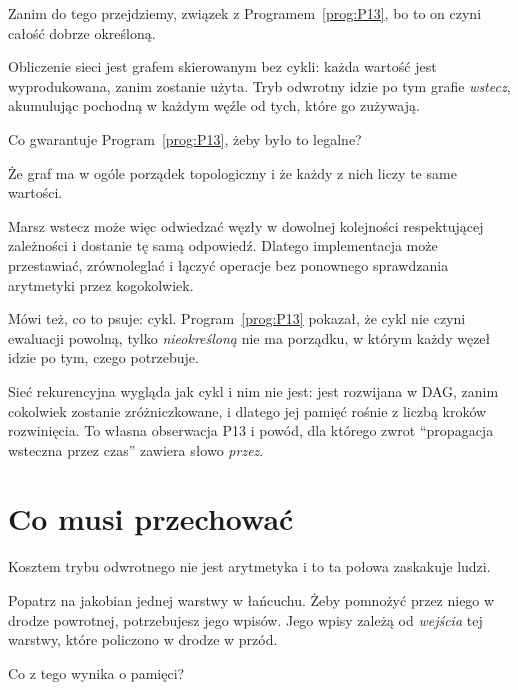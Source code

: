 \begin{fr}
Zanim do tego przejdziemy, związek z Programem~\ref{prog:P13}, bo to on czyni
całość dobrze określoną.

Obliczenie sieci jest grafem skierowanym bez cykli: każda wartość jest
wyprodukowana, zanim zostanie użyta. Tryb odwrotny idzie po tym grafie
\emph{wstecz}, akumulując pochodną w każdym węźle od tych, które go zużywają.

Co gwarantuje Program~\ref{prog:P13}, żeby było to legalne?
\nextframe
\end{fr}

\begin{fr}
\begin{ansblock}
Że graf ma w ogóle porządek topologiczny i że każdy z nich liczy te same
wartości.
\end{ansblock}

Marsz wstecz może więc odwiedzać węzły w dowolnej kolejności respektującej
zależności i dostanie tę samą odpowiedź. Dlatego implementacja może
przestawiać, zrównoleglać i łączyć operacje bez ponownego sprawdzania
arytmetyki przez kogokolwiek.

\begin{note}
Mówi też, co to psuje: cykl. Program~\ref{prog:P13} pokazał, że cykl nie czyni
ewaluacji powolną, tylko \emph{nieokreśloną} \dash{} nie ma porządku, w którym
każdy węzeł idzie po tym, czego potrzebuje.

Sieć rekurencyjna wygląda jak cykl i nim nie jest: jest rozwijana w DAG, zanim
cokolwiek zostanie zróżniczkowane, i dlatego jej pamięć rośnie z liczbą kroków
rozwinięcia. To własna obserwacja P13 i powód, dla którego zwrot
\enquote{propagacja wsteczna przez czas} zawiera słowo \emph{przez}.
\end{note}
\end{fr}

\section{Co musi przechować}
\label{sec:P16-memory}

\begin{fr}
Kosztem trybu odwrotnego nie jest arytmetyka i to ta połowa zaskakuje ludzi.

Popatrz na jakobian jednej warstwy w łańcuchu. Żeby pomnożyć przez niego w
drodze powrotnej, potrzebujesz jego wpisów. Jego wpisy zależą od
\emph{wejścia} tej warstwy, które policzono w drodze w przód.

Co z tego wynika o pamięci?
\dotline
\nextframe
\end{fr}

